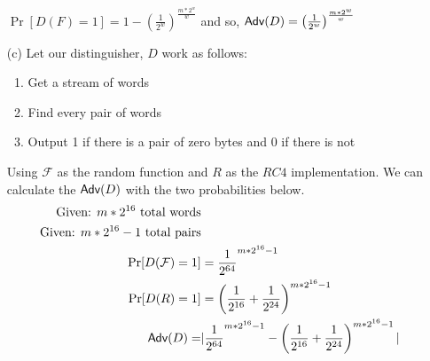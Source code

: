 \documentclass[11pt]{article}
\begin{document}
\begin{itemize}
  $\Pr[D(F)=1] = 1 - \left( \frac{1}{2^w}\right)^{\frac{m* 2^w}{w}}$
  and so, $\textsf{Adv}({D}) =\left( \frac{1}{2^w}\right)^{\frac{m* 2^w}{w}}$
\item[(c)] 
  Let our distinguisher, $D$ work as follows:
  \begin{enumerate}
    \item Get a stream of words
    \item Find every pair of words
    \item Output 1 if there is a pair of zero bytes and 0 if there is not
  \end{enumerate}
  Using $\mathcal{F}$ as the random function and $R$ as the $RC4$ implementation.
  We can calculate the $\textsf{Adv}({D})$ with the two probabilities below.
  \begin{align}
    \text{Given: } m*2^{16} \text{ total words}& \nonumber \\
    \text{Given: } m*2^{16} -1 \text{ total pairs}& \nonumber \\
    \Pr[D(\mathcal{F}) = 1]& = \frac{1}{2^{64}} ^ {m*2^{16} -1 } \nonumber \\
    \Pr[D(R) = 1]& = \left(\frac{1}{2^{16}} + \frac{1}{2^{24}} \right) ^ {m*2^{16} -1 } \nonumber \\
    \textsf{Adv}({D}) =&| \frac{1}{2^{64}} ^ {m*2^{16} -1 } -  \left(\frac{1}{2^{16}} + \frac{1}{2^{24}} \right) ^ {m*2^{16} -1 } |  \nonumber \\
  \end{align}
\end{itemize}
\end{document}
